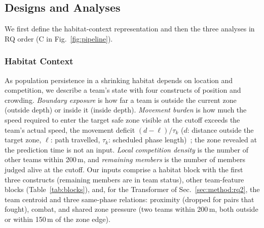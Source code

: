 \documentclass[conference]{IEEEtran}
\begin{document}
\subsection{Designs and Analyses}
\label{sec:method:design}
We first define the habitat-context representation and then the three analyses in RQ order (C in Fig.~\ref{fig:pipeline}).

\subsubsection{Habitat Context}
\label{sec:method:representation}
As population persistence in a shrinking habitat depends on location and competition, we describe a team's state with four constructs of position and crowding.
\emph{Boundary exposure} is how far a team is outside the current zone (outside depth) or inside it (inside depth).
\emph{Movement burden} is how much the speed required to enter the target safe zone visible at the cutoff exceeds the team's actual speed, the movement deficit $(d-\ell)/\tau_k$ ($d$: distance outside the target zone, $\ell$: path travelled, $\tau_k$: scheduled phase length)~\cite{Nathan08}; the zone revealed at the prediction time is not an input.
\emph{Local competition density} is the number of other teams within 200\,m, and \emph{remaining members} is the number of members judged alive at the cutoff.
Our inputs comprise a habitat block with the first three constructs (remaining members are in team status), other team-feature blocks (Table~\ref{tab:blocks}), and, for the Transformer of Sec.~\ref{sec:method:rq2}, the team centroid and three same-phase relations: proximity (dropped for pairs that fought), combat, and shared zone pressure (two teams within 200\,m, both outside or within 150\,m of the zone edge).
\end{document}
